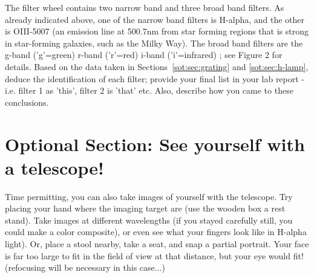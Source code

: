 The filter wheel contains two narrow band and three broad band filters. As already indicated
above, one of the narrow band filters is H-alpha, and the other is OIII-5007 (an emission line
at 500.7nm from star forming regions that is strong in star-forming galaxies, such as the Milky
Way). The broad band filters are the g-band (’g’=green) r-band (’r’=red) i-band (’i’=infrared) ;
see Figure 2 for details. Based on the data taken in Sections~\ref{sot:sec:grating} and \ref{sot:sec:h-lamp}, deduce the identification of
each filter; provide your final list in your lab report - i.e. filter 1 as ’this’, filter 2 is ’that’ etc.
Also, describe how you came to these conclusions.

\section{Optional Section: See yourself with a telescope!}

Time permitting, you can also take images of yourself with the telescope.
Try placing your hand where the imaging target are (use the wooden box a
rest stand). Take images at different wavelengths (if you stayed carefully
still, you could make a color composite), or even see what your fingers
look like in H-alpha light). Or, place a stool nearby, take a seat, and
snap a partial portrait. Your face is far too large to fit in the field of
view at that distance, but your eye would fit! (refocusing will be
necessary in this case...)